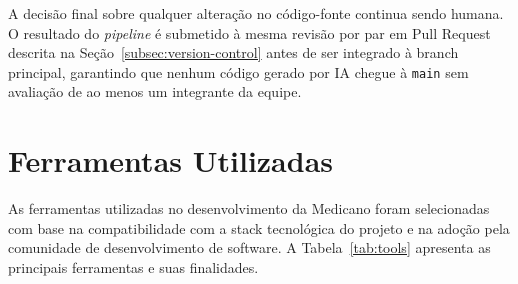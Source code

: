A decisão final sobre qualquer alteração no código-fonte
continua sendo humana. O resultado do \textit{pipeline}
é submetido à mesma revisão por par em Pull Request
descrita na Seção~\ref{subsec:version-control} antes de
ser integrado à branch principal, garantindo que nenhum
código gerado por IA chegue à \texttt{main} sem
avaliação de ao menos um integrante da equipe.

\section{Ferramentas Utilizadas}
\label{sec:tools}

As ferramentas utilizadas no desenvolvimento da Medicano
foram selecionadas com base na compatibilidade com a
stack tecnológica do projeto e na adoção pela comunidade
de desenvolvimento de software. A
Tabela~\ref{tab:tools} apresenta as principais
ferramentas e suas finalidades.

